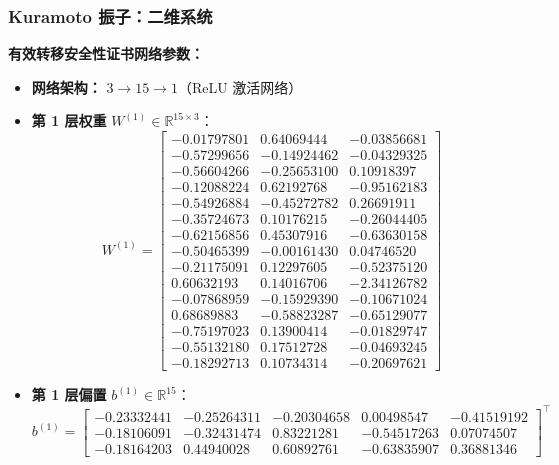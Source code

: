 	\subsubsection{Kuramoto 振子：二维系统}
	\label{app:ko2d_neural}
	
	\textbf{有效转移安全性证书网络参数：}
	
	\begin{itemize}
	    \item \textbf{网络架构：} $3 \rightarrow 15 \rightarrow 1$（ReLU 激活网络）
	    \item \textbf{第 1 层权重} $W^{(1)} \in \mathbb{R}^{15 \times 3}$：
	    {\footnotesize
	    \[
	    W^{(1)} = \begin{bmatrix}
	    -0.01797801 &  0.64069444 & -0.03856681 \\
	    -0.57299656 & -0.14924462 & -0.04329325 \\
	    -0.56604266 & -0.25653100 &  0.10918397 \\
	    -0.12088224 &  0.62192768 & -0.95162183 \\
	    -0.54926884 & -0.45272782 &  0.26691911 \\
	    -0.35724673 &  0.10176215 & -0.26044405 \\
	    -0.62156856 &  0.45307916 & -0.63630158 \\
	    -0.50465399 & -0.00161430 &  0.04746520 \\
	    -0.21175091 &  0.12297605 & -0.52375120 \\
	     0.60632193 &  0.14016706 & -2.34126782 \\
	    -0.07868959 & -0.15929390 & -0.10671024 \\
	     0.68689883 & -0.58823287 & -0.65129077 \\
	    -0.75197023 &  0.13900414 & -0.01829747 \\
	    -0.55132180 &  0.17512728 & -0.04693245 \\
	    -0.18292713 &  0.10734314 & -0.20697621
	    \end{bmatrix}
	    \]}
	    
	    \item \textbf{第 1 层偏置} $b^{(1)} \in \mathbb{R}^{15}$：
	    {\scriptsize
	    \[
	    b^{(1)} = \begin{bmatrix}
	    -0.23332441 & -0.25264311 & -0.20304658 &  0.00498547 & -0.41519192 \\
	    -0.18106091 & -0.32431474 &  0.83221281 & -0.54517263 &  0.07074507 \\
	    -0.18164203 &  0.44940028 &  0.60892761 & -0.63835907 &  0.36881346
	    \end{bmatrix}^\top
	    \]}
	    

\end{itemize}
